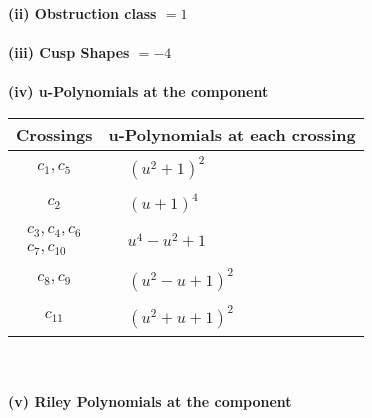 \documentclass[1p]{elsarticle_modified}
\theoremstyle{definition}
\begin{document}
\flushleft \textbf{(ii) Obstruction class $= 1$}\\~\\
\flushleft \textbf{(iii) Cusp Shapes $= -4$}\\~\\
\newpage\renewcommand{\arraystretch}{1}
\flushleft \textbf{(iv) u-Polynomials at the component}\newline \\
\begin{tabular}{m{50pt}|m{274pt}}
Crossings & \hspace{64pt}u-Polynomials at each crossing \\
\hline $$\begin{aligned}c_{1},c_{5}\end{aligned}$$&$\begin{aligned}
&(u^2+1)^2
\end{aligned}$\\
\hline $$\begin{aligned}c_{2}\end{aligned}$$&$\begin{aligned}
&(u+1)^4
\end{aligned}$\\
\hline $$\begin{aligned}c_{3},c_{4},c_{6}\\c_{7},c_{10}\end{aligned}$$&$\begin{aligned}
&u^4- u^2+1
\end{aligned}$\\
\hline $$\begin{aligned}c_{8},c_{9}\end{aligned}$$&$\begin{aligned}
&(u^2- u+1)^2
\end{aligned}$\\
\hline $$\begin{aligned}c_{11}\end{aligned}$$&$\begin{aligned}
&(u^2+u+1)^2
\end{aligned}$\\
\hline
\end{tabular}\\~\\
\newpage\renewcommand{\arraystretch}{1}
\flushleft \textbf{(v) Riley Polynomials at the component}\newline \\
\end{document}
